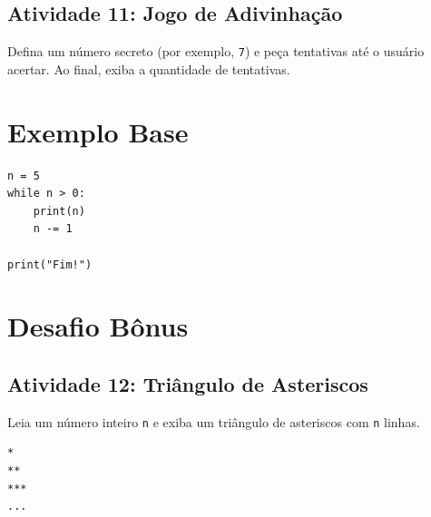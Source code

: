 \documentclass[12pt]{article}
\begin{document}
\subsection*{Atividade 11: Jogo de Adivinhação}
Defina um número secreto (por exemplo, \texttt{7}) e peça tentativas até o usuário acertar. Ao final, exiba a quantidade de tentativas.

\section*{Exemplo Base}
\begin{lstlisting}
n = 5
while n > 0:
    print(n)
    n -= 1

print("Fim!")
\end{lstlisting}

\section*{Desafio Bônus}
\subsection*{Atividade 12: Triângulo de Asteriscos}
Leia um número inteiro \texttt{n} e exiba um triângulo de asteriscos com \texttt{n} linhas.

\begin{lstlisting}
*
**
***
...
\end{lstlisting}
\end{document}
